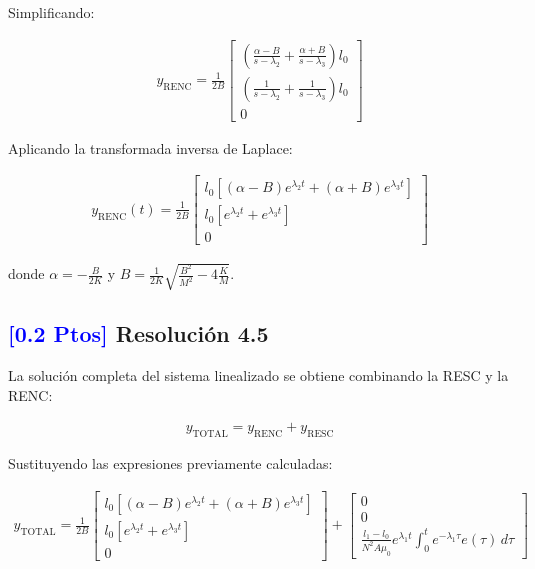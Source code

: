 \documentclass[
  11pt,
  letterpaper,
   addpoints,
   answers
  ]{exam}
\begin{document}
\begin{solution}
Simplificando:

\begin{align}
y_{\text{RENC}} = \frac{1}{2B} \begin{bmatrix}
\left(\frac{\alpha - B}{s - \lambda_2} + \frac{\alpha + B}{s - \lambda_3}\right) l_0 \\
\left(\frac{1}{s - \lambda_2} + \frac{1}{s - \lambda_3}\right) l_0 \\
0
\end{bmatrix}
\end{align}

Aplicando la transformada inversa de Laplace:

\begin{align}
y_{\text{RENC}}(t) = \frac{1}{2B} \begin{bmatrix}
l_0[(\alpha - B)e^{\lambda_2 t} + (\alpha + B)e^{\lambda_3 t}] \\
l_0[e^{\lambda_2 t} + e^{\lambda_3 t}] \\
0
\end{bmatrix}
\end{align}

donde $\alpha = -\frac{B}{2K}$ y $B = \frac{1}{2K}\sqrt{\frac{B^2}{M^2} - 4\frac{K}{M}}$.

\subsection*{\textcolor{blue}{[0.2 Ptos]} Resolución 4.5}

La solución completa del sistema linealizado se obtiene combinando la RESC y la RENC:

\begin{align}
y_{\text{TOTAL}} = y_{\text{RENC}} + y_{\text{RESC}}
\end{align}

Sustituyendo las expresiones previamente calculadas:

\begin{align}
y_{\text{TOTAL}} = \frac{1}{2B} \begin{bmatrix}
l_0[(\alpha - B)e^{\lambda_2 t} + (\alpha + B)e^{\lambda_3 t}] \\
l_0[e^{\lambda_2 t} + e^{\lambda_3 t}] \\
0
\end{bmatrix} + \begin{bmatrix}
0 \\
0 \\
\frac{l_1 - l_0}{N^2A\mu_0} e^{\lambda_1 t} \int_0^t e^{-\lambda_1\tau} e(\tau) \, d\tau
\end{bmatrix}
\end{align}


\end{solution}
\end{document}
